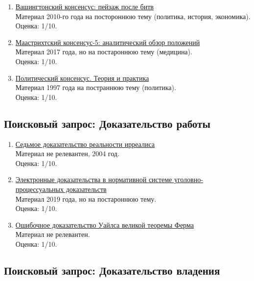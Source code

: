 \documentclass[a4paper, 12pt]{report}		%
\begin{document}
\begin{enumerate}
\item \href{https://economics.hse.ru/data/2011/02/14/1208909692/2010%20%D0%9C%D0%AD%D0%9C%D0%9E.pdf}{Вашингтонский консенсус: пейзаж после битв}\\
Материал 2010-го года на постороннюю тему (политика, история, экономика).\\
Оценка: 1/10.
\item \href{https://cyberleninka.ru/article/n/maastrihtskiy-konsensus-5-analiticheskiy-obzor-polozheniy}{Маастрихтский консенсус-5: аналитический обзор положений}\\
Материал 2017 года, но на постароннюю тему (медицина).\\
Оценка: 1/10.
\item \href{https://elibrary.ru/item.asp?id=26226720}{Политический консенсус. Теория и практика}\\
Материал 1997 года на постраннюю тему (политика).\\
Оценка: 1/10.
\end{enumerate}

\subsection*{Поисковый запрос: Доказательство работы}

\begin{enumerate}
\item \href{https://iling-ran.ru/library/grammar_theory_group/itg3.pdf#page=27}{Седьмое доказательство реальности ирреалиса}\\
Материал не релевантен, 2004 год.\\
Оценка: 1/10.
\item \href{https://cyberleninka.ru/article/n/elektronnye-dokazatelstva-v-normativnoy-sisteme-ugolovno-protsessualnyh-dokazatelstv}{Электронные доказательства в нормативной системе уголовно-процессуальных доказательств}\\
Материал 2019 года, но на постароннюю тему.\\
Оценка: 1/10.
\item \href{https://s.fundamental-research.ru/pdf/2008/3/1.pdf}{Ошибочное доказательство Уайлса великой теоремы Ферма}\\
Материал не релевантен.\\
Оценка: 1/10.
\end{enumerate}

\subsection*{Поисковый запрос: Доказательство владения}
\end{document}
